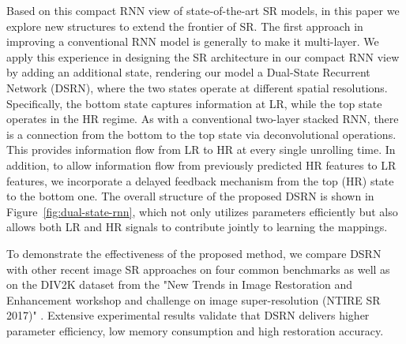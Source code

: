 \documentclass[10pt,twocolumn,letterpaper]{article}
\newcommand{\algname}{DSRN }
\newcommand{\algnamens}{DSRN}
\begin{document}
Based on this compact RNN view of state-of-the-art SR models,  in this paper we explore new structures to extend the frontier of SR.   The first approach in improving a conventional RNN model is generally to make it multi-layer.  We apply this experience in designing the SR architecture in our compact RNN view by adding an additional state, rendering our model a Dual-State Recurrent Network (\algnamens), where the two states operate at different spatial resolutions.  Specifically, the bottom state captures information at LR, while the top state operates in the HR regime.  As with a conventional two-layer stacked RNN, there is a  connection from the bottom to the top state via deconvolutional operations.  This provides information flow from LR to HR at every single unrolling time.   In addition, to allow information flow from previously predicted HR features to LR features, we incorporate a delayed feedback mechanism \cite{chung2015gated} from the top (HR) state to the bottom one.  The overall structure of the proposed \algname is shown in Figure~\ref{fig:dual-state-rnn}, which not only utilizes parameters efficiently but also allows both LR and HR signals to contribute jointly to learning the mappings.  

To demonstrate the effectiveness of the proposed method, we compare \algname with other recent image SR approaches on four common benchmarks \cite{bevilacqua2012low, huang2015single, martin2001database, zeyde2010single} as well as on the DIV2K dataset from the "New Trends in Image Restoration and Enhancement workshop and challenge on image super-resolution (NTIRE SR 2017)" \cite{agustsson2017ntire}. Extensive experimental results validate that \algname delivers higher parameter efficiency, low memory consumption and high restoration accuracy.
\end{document}
